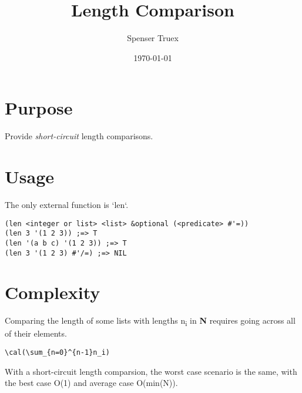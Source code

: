 \documentclass[11pt]{article}
\author{Spenser Truex}
\date{\today}
\title{Length Comparison}
\begin{document}
\maketitle
\tableofcontents

\section{Purpose}
\label{sec:org3bdca94}
Provide \emph{short-circuit} length comparisons.
\section{Usage}
\label{sec:org1c4a8ca}
The only external function is `len`.
\begin{verbatim}
(len <integer or list> <list> &optional (<predicate> #'=))
(len 3 '(1 2 3)) ;=> T
(len '(a b c) '(1 2 3)) ;=> T
(len 3 '(1 2 3) #'/=) ;=> NIL
\end{verbatim}
\section{Complexity}
\label{sec:orgeab79b2}
Comparing the length of some lists with lengths n\textsubscript{i} in \textbf{N} requires going
across all of their elements.
\begin{verbatim}
\cal(\sum_{n=0}^{n-1}n_i)
\end{verbatim}

With a short-circuit length comparsion, the worst case scenario is the same, with the best case O(1) and average case O(min(N)).
\end{document}
